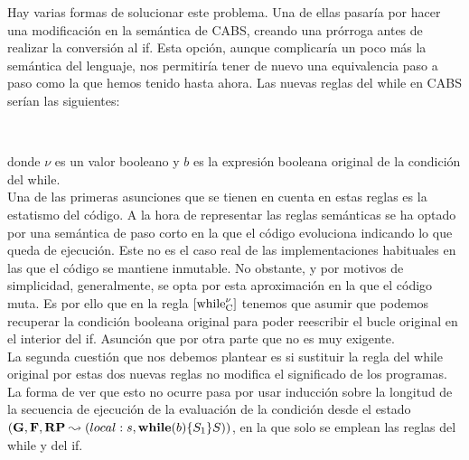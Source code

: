 Hay varias formas de solucionar este problema. Una de ellas pasaría por hacer una modificación en la semántica de CABS, creando una prórroga antes de realizar la conversión al if. Esta opción, aunque complicaría un poco más la semántica del lenguaje, nos permitiría tener de nuevo una equivalencia paso a paso como la que hemos tenido hasta ahora. Las nuevas reglas del while en CABS serían las siguientes:


\begin{prooftree*}
\end{prooftree*}\\
\begin{prooftree*}
\end{prooftree*} donde $\nu$ es un valor booleano y $b$ es la expresión booleana original de la condición del while.\\

Una de las primeras asunciones que se tienen en cuenta en estas reglas es la estatismo del código. A la hora de representar las reglas semánticas se ha optado por una semántica de paso corto en la que el código evoluciona indicando lo que queda de ejecución. Este no es el caso real de las implementaciones habituales en las que el código se mantiene inmutable. No obstante, y por motivos de simplicidad, generalmente, se opta por esta aproximación en la que el código muta. Es por ello que en la regla $\left[ \text{while}_{\text{C}}^{\nu} \right]$ tenemos que asumir que podemos recuperar la condición booleana original para poder reescribir el bucle original en el interior del if. Asunción que por otra parte que no es muy exigente.\\

La segunda cuestión que nos debemos plantear es si sustituir la regla del while original por estas dos nuevas reglas no modifica el significado de los programas. La forma de ver que esto no ocurre pasa por usar inducción sobre la longitud de la secuencia de ejecución de la evaluación de la condición desde el estado $(\mathbf{G}, \mathbf{F}, \textbf{RP} \leadsto (local:s, \mbox{\textbf{while}} (b) \{S_1\}S))$, en la que solo se emplean las reglas del while y del if.\\

